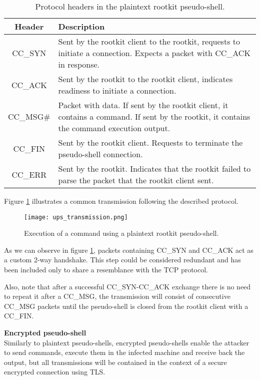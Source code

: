 \begin{table}[htbp]
\begin{tabular}{|c|>{\centering\arraybackslash}p{8cm}|}
\hline
\textbf{Header} & \textbf{Description}\\
\hline
\hline
CC\_SYN & Sent by the rootkit client to the rootkit, requests to initiate a connection. Expects a packet with CC\_ACK in response.\\
\hline
CC\_ACK & Sent by the rootkit to the rootkit client, indicates readiness to initiate a connection.\\
\hline
CC\_MSG\# & Packet with data. If sent by the rootkit client, it contains a command. If sent by the rootkit, it contains the command execution output.\\
\hline
CC\_FIN & Sent by the rootkit client. Requests to terminate the pseudo-shell connection.\\
\hline
CC\_ERR & Sent by the rootkit. Indicates that the rootkit failed to parse the packet that the rootkit client sent.\\
\hline
\end{tabular}
\caption{Protocol headers in the plaintext rootkit pseudo-shell.}
\label{table:ups_headers}
\end{table}

Figure \ref{fig:ups_transmission} illustrates a common transmission following the described protocol.

\begin{figure}[htbp]
	\centering
	\texttt{[image: ups\_transmission.png]}
	\caption{Execution of a command using a plaintext rootkit pseudo-shell.}
	\label{fig:ups_transmission}
\end{figure}

As we can observe in figure \ref{fig:ups_transmission}, packets containing CC\_SYN and CC\_ACK act as a custom 2-way handshake. This step could be considered redundant and has been included only to share a resemblance with the TCP protocol.

Also, note that after a successful CC\_SYN-CC\_ACK exchange there is no need to repeat it after a CC\_MSG, the transmission will consist of consecutive CC\_MSG packets until the pseudo-shell is closed from the rootkit client with a CC\_FIN.


\textbf{Encrypted pseudo-shell}\\
Similarly to plaintext pseudo-shells, encrypted pseudo-shells enable the attacker to send commands, execute them in the infected machine and receive back the output, but all transmissions will be contained in the context of a secure encrypted connection using TLS.

